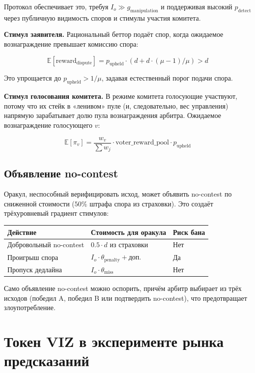 \documentclass{ledger}
\theoremstyle{plain}
\theoremstyle{remark}
\begin{document}
Протокол обеспечивает это, требуя $I_o \gg g_{\text{manipulation}}$ и поддерживая
высокий $p_{\text{detect}}$ через публичную видимость споров и стимулы участия
комитета.

\textbf{Стимул заявителя.} Рациональный беттор подаёт спор, когда ожидаемое
вознаграждение превышает комиссию спора:

\[
\mathbb{E}[\text{reward}_{\text{dispute}}] = p_{\text{upheld}} \cdot (d + d \cdot
(\mu - 1) / \mu) > d
\]

Это упрощается до $p_{\text{upheld}} > 1/\mu$, задавая естественный порог подачи
спора.

\textbf{Стимул голосования комитета.} В режиме комитета голосующие участвуют, потому
что их стейк в «ленивом» пуле (и, следовательно, вес управления) напрямую
зарабатывает долю пула вознаграждения арбитра. Ожидаемое вознаграждение голосующего
$v$:

\[
\mathbb{E}[\pi_v] = \frac{w_v}{\sum w_j} \cdot \text{voter\_reward\_pool} \cdot
p_{\text{upheld}}
\]

\subsection{Объявление no-contest}

Оракул, неспособный верифицировать исход, может объявить no-contest по сниженной
стоимости ($50\%$ штрафа спора из страховки). Это создаёт трёхуровневый градиент
стимулов:

\begin{center}
\begin{tabular}{lll}
\hline
\textbf{Действие} & \textbf{Стоимость для оракула} & \textbf{Риск бана} \\
\hline
Добровольный no-contest & $0.5 \cdot d$ из страховки & Нет \\
Проигрыш спора & $I_o \cdot \theta_{\text{penalty}} + \text{доп.}$ & Да \\
Пропуск дедлайна & $I_o \cdot \theta_{\text{miss}}$ & Нет \\
\hline
\end{tabular}
\end{center}

Само объявление no-contest можно оспорить, причём арбитр выбирает из трёх исходов
(победил A, победил B или подтвердить no-contest), что предотвращает злоупотребление.

\section{Токен VIZ в эксперименте рынка предсказаний}\label{sec:token}
\end{document}
